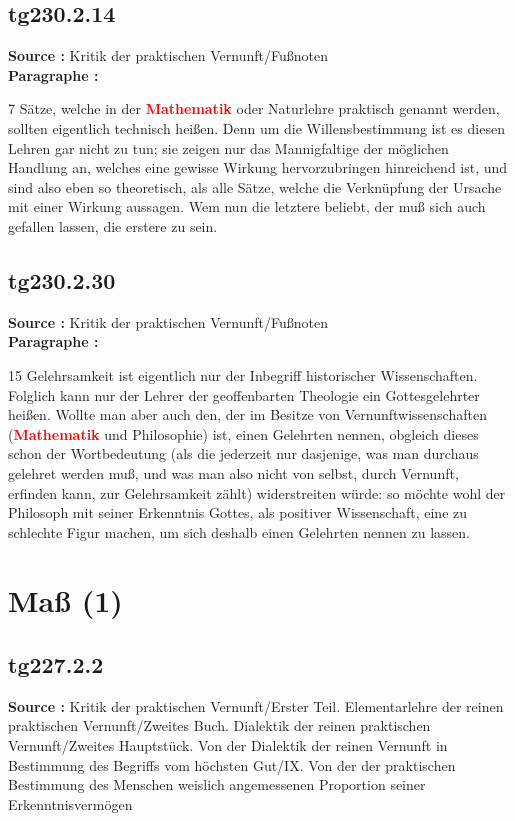 \documentclass[a4paper,12pt,twoside]{book}
\newcommand{\match}[1]{\textcolor{red}{\textbf{#1}}}
\newcommand{\unnumberedsection}[1]{
	\section*{#1}
	\addcontentsline{toc}{section}{#1}
	\markright{#1}
}
\begin{document}
	\subsection*{tg230.2.14} 
	\textbf{Source : }Kritik der praktischen Vernunft/Fußnoten\\  
	
	\textbf{Paragraphe : }
	
	7 Sätze, welche in der \match{Mathematik} oder Naturlehre praktisch genannt werden, sollten eigentlich technisch heißen. Denn um die Willensbestimmung ist es diesen Lehren gar nicht zu tun; sie zeigen nur das Mannigfaltige der möglichen Handlung an, welches eine gewisse Wirkung hervorzubringen hinreichend ist, und sind also eben so theoretisch, als alle Sätze, welche die Verknüpfung der Ursache mit einer Wirkung aussagen. Wem nun die letztere beliebt, der muß sich auch gefallen lassen, die erstere zu sein. 
	
	\subsection*{tg230.2.30} 
	\textbf{Source : }Kritik der praktischen Vernunft/Fußnoten\\  
	
	\textbf{Paragraphe : }
	
	15
	Gelehrsamkeit ist eigentlich nur der Inbegriff historischer Wissenschaften. Folglich kann nur der Lehrer der geoffenbarten Theologie ein Gottesgelehrter heißen. Wollte man aber auch den, der im Besitze von Vernunftwissenschaften (\match{Mathematik} und Philosophie) ist, einen Gelehrten nennen, obgleich dieses schon der Wortbedeutung (als die jederzeit nur dasjenige, was man durchaus gelehret werden muß, und was man also nicht von selbst, durch Vernunft, erfinden kann, zur Gelehrsamkeit zählt) widerstreiten würde: so möchte wohl der Philosoph mit seiner Erkenntnis Gottes, als positiver Wissenschaft, eine zu schlechte Figur machen, um sich deshalb einen Gelehrten nennen zu lassen. 
	
	\unnumberedsection{Maß (1)} 
	\subsection*{tg227.2.2} 
	\textbf{Source : }Kritik der praktischen Vernunft/Erster Teil. Elementarlehre der reinen praktischen Vernunft/Zweites Buch. Dialektik der reinen praktischen Vernunft/Zweites Hauptstück. Von der Dialektik der reinen Vernunft in Bestimmung des Begriffs vom höchsten Gut/IX. Von der der praktischen Bestimmung des Menschen weislich angemessenen Proportion seiner Erkenntnisvermögen\\  
	
\end{document}

